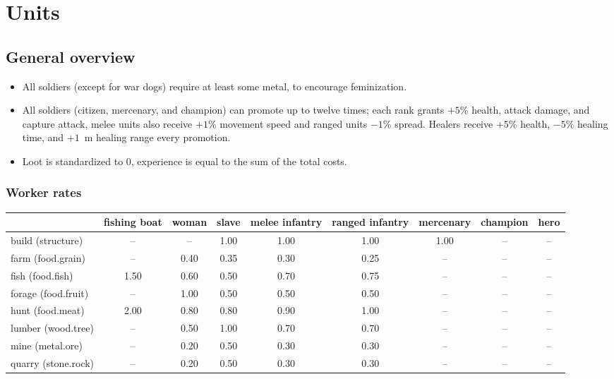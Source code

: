 \documentclass{article}
\begin{document}
\clearpage
\section{Units}
\subsection{General overview}
\begin{itemize}
  \item All soldiers (except for war dogs) require at least some metal, to encourage feminization.
  \item All soldiers (citizen, mercenary, and champion) can promote up to twelve times; each rank grants $+5\%$ health, attack damage, and capture attack, melee units also receive $+1\%$ movement speed and ranged units $-1\%$ spread.
  \subitem Healers receive $+5\%$ health, $-5\%$ healing time, and $+1$~m healing range every promotion.
  \item Loot is standardized to $0$, experience is equal to the sum of the total costs.
\end{itemize}


\subsubsection{Worker rates}
\begin{tabular}{l|cccccccc}
 & fishing boat & woman & slave & melee infantry & ranged infantry & mercenary & champion & hero \\
\hline
build (structure)   &  --  &  --  & 1.00 & 1.00 & 1.00 & 1.00 &  --  &  --  \\
farm (food.grain)   &  --  & 0.40 & 0.35 & 0.30 & 0.25 &  --  &  --  &  --  \\
fish (food.fish)    & 1.50 & 0.60 & 0.50 & 0.70 & 0.75 &  --  &  --  &  --  \\
forage (food.fruit) &  --  & 1.00 & 0.50 & 0.50 & 0.50 &  --  &  --  &  --  \\
hunt (food.meat)    & 2.00 & 0.80 & 0.80 & 0.90 & 1.00 &  --  &  --  &  --  \\
lumber (wood.tree)  &  --  & 0.50 & 1.00 & 0.70 & 0.70 &  --  &  --  &  --  \\
mine (metal.ore)    &  --  & 0.20 & 0.50 & 0.30 & 0.30 &  --  &  --  &  --  \\
quarry (stone.rock) &  --  & 0.20 & 0.50 & 0.30 & 0.30 &  --  &  --  &  --  \\
\end{tabular}
\end{document}
